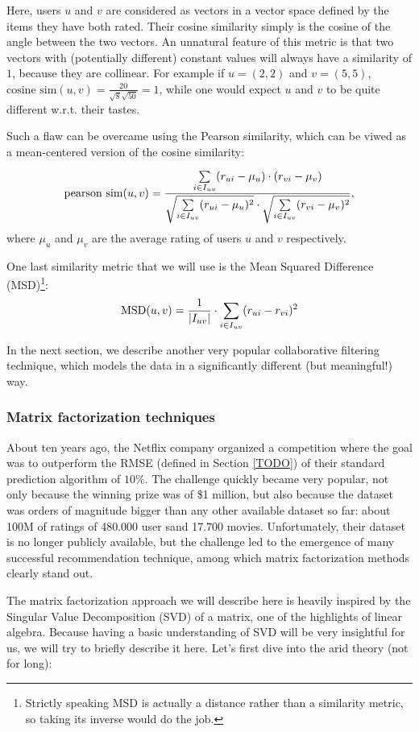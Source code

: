 Here, users $u$ and $v$ are considered as vectors in a vector space defined by
the items they have both rated. Their cosine similarity simply is the cosine of
the angle between the two vectors. An unnatural feature of this metric is that
two vectors with (potentially different) constant values will always have a
similarity of $1$, because they are collinear. For example if $u = (2, 2)$ and
$v = (5, 5)$, $\text{cosine sim}(u, v) = \frac{20}{\sqrt{8}\sqrt{50}} = 1$,
while one would expect $u$ and $v$ to be quite different w.r.t. their tastes.

Such a flaw can be overcame using the Pearson similarity, which can be viwed as
a mean-centered version of the cosine similarity:

$$
\text{pearson sim}(u, v) = \frac{ \sum\limits_{i \in I_{uv}}
(r_{ui} -  \mu_u) \cdot (r_{vi} - \mu_{v})} {\sqrt{\sum\limits_{i
\in I_{uv}} (r_{ui} -  \mu_u)^2} \cdot \sqrt{\sum\limits_{i \in
I_{uv}} (r_{vi} -  \mu_{v})^2}},
$$
where $\mu_u$ and $\mu_v$ are the average rating of users $u$ and $v$
respectively.

One last similarity metric that we will use is the Mean Squared Difference
(MSD)\footnote{Strictly speaking MSD is actually a distance rather than a
similarity metric, so taking its inverse would do the job.}:
$$\text{MSD}(u, v) = \frac{1}{|I_{uv}|} \cdot \sum\limits_{i \in I_{uv}} (r_{ui} -
r_{vi})^2$$

In the next section, we describe another very popular collaborative filtering
technique, which models the data in a significantly different (but meaningful!)
way.

\subsubsection{Matrix factorization techniques}

About ten years ago, the Netflix company organized a competition where the goal
was to outperform the RMSE (defined in Section \ref{TODO}) of their standard
prediction algorithm of $10\%$. The challenge quickly became very popular, not
only because the winning prize was of \$1 million, but also because the dataset
was orders of magnitude bigger than any other available dataset so far: about
100M of ratings of 480.000 user sand 17.700 movies. Unfortunately, their
dataset is no longer publicly available, but the challenge led to the emergence
of many successful recommendation technique, among which matrix factorization
methods clearly stand out.

The matrix factorization approach we will describe here is heavily inspired by
the Singular Value Decomposition (SVD) of a matrix, one of the highlights of
linear algebra. Because having a basic understanding of SVD will be very
insightful for us, we will try to briefly describe it here. Let's first dive
into the arid theory (not for long):

